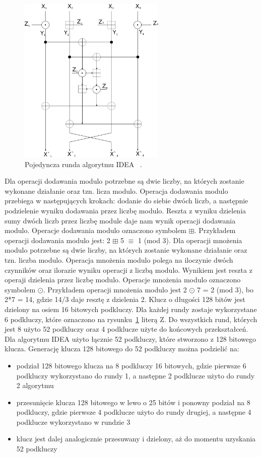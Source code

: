 \documentclass[12p]{article}
\begin{document}
\begin{figure}[H]
\centering
\includegraphics[width=7cm]{idea.png}
\caption{Pojedyncza runda algorytmu IDEA ~\cite{IDEA}.}\label{idea}
\end{figure}


Dla operacji dodawania modulo potrzebne są dwie liczby, na których zostanie wykonane działanie oraz tzn. licza modulo. Operacja dodawania modulo przebiega w następujących krokach: dodanie do siebie dwóch liczb, a następnie podzielenie wyniku dodawania przez liczbę modulo. Reszta z wyniku dzielenia sumy dwóch liczb przez liczbę module daje nam wynik operacji dodawania modulo. Operacje dodawania modulo oznaczono symbolem $\boxplus$. Przykładem operacji dodawania modulo jest: 2 $\boxplus$ 5 $\equiv$ 1 (mod 3). Dla operacji mnożenia modulo potrzebne są dwie liczby, na których zostanie wykonane działanie oraz tzn. liczba modulo. Operacja mnożenia modulo polega na iloczynie dwóch czynników oraz ilorazie wyniku operacji z liczbą modulo. Wynikiem jest reszta z operaji dzielenia przez liczbę modulo. Operacje mnożenia modulo oznaczono symbolem $\odot$. Przykładem operacji mnożenia modulo jest 2  $\odot$ 7 = 2 (mod 3), bo 2*7 = 14, gdzie 14/3 daje resztę z dzielenia 2.
Klucz o długości 128 bitów jest dzielony na osiem 16 bitowych podkluczy. Dla każdej rundy zostaje wykorzystane 6 podkluczy, które oznaczono na rysunku~\ref{idea} literą Z. Do wszystkich rund, których jest 8 użyto 52 podkluczy oraz 4 podklucze użyte do końcowych przekształceń. Dla algorytmu IDEA użyto łącznie 52 podkluczy, które stworzono z 128 bitowego klucza. Generację klucza 128 bitowego do 52 podkluczy można podzielić na:
\begin{itemize}
\item podział 128 bitowego klucza na 8 podkluczy 16 bitowych, gdzie pierwsze 6 podkluczy wykorzystano do rundy 1, a następne 2 podklucze użyto do rundy 2 algorytmu
\item przesunięcie klucza 128 bitowego w lewo o 25 bitów i ponowny podział na 8 podkluczy, gdzie pierwsze 4 podklucze użyto do rundy drugiej, a następne 4 podklucze wykorzystano w rundzie 3
\item klucz jest dalej analogicznie przesuwany i dzielony, aż do momentu uzyskania 52 podkluczy
\end{itemize}
\end{document}
